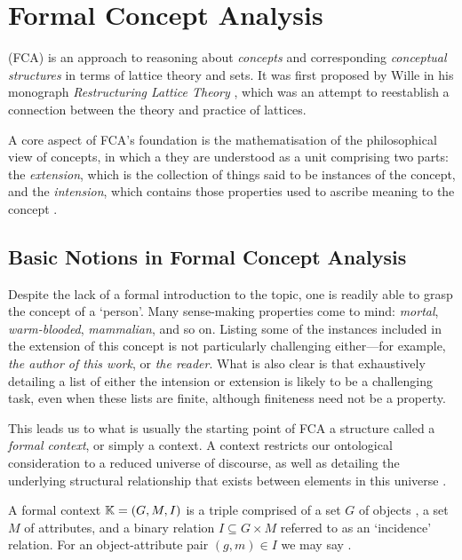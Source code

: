 \chapter{Formal Concept Analysis}
\label{chapter:formal-concept-analysis}


\FCA (FCA) \cite{Wille_Restructuring,WILLE1992493,ganter1999formal} is an
approach to reasoning about \textit{concepts} and corresponding
\textit{conceptual structures} in terms of lattice theory and sets. It was
first proposed by Wille in his monograph \textit{Restructuring Lattice Theory}
\cite{Wille_Restructuring}, which was an attempt to reestablish a connection
between the theory and practice of lattices.

A core aspect of FCA’s foundation is the mathematisation of the philosophical
view of concepts, in which a they are understood as a unit comprising two
parts: the \textit{extension}, which is the collection of things said to be
instances of the concept, and the \textit{intension}, which contains those
properties used to ascribe meaning to the concept \cite{DUQUENNE1999407}.

\section{Basic Notions in Formal Concept Analysis}
\label{section:basic-notions}

Despite the lack of a formal introduction to the topic, one is readily
able to grasp the concept of a `person'. Many sense-making properties
come to mind: \textit{mortal}, \textit{warm-blooded}, \textit{mammalian}, and so
on. Listing some of the instances included in the extension of this concept is
not particularly challenging either---for example, \textit{the author of this
	work}, or \textit{the reader}. What is also clear is that exhaustively detailing
a list of either the intension or extension is likely to be a challenging task,
even when these lists are finite, although finiteness need not be a property.

This leads us to what is usually the starting point of FCA a structure called a
\textit{formal context}, or simply a context. A context restricts our ontological
consideration to a reduced universe of discourse, as well as detailing the
underlying structural relationship that exists between elements in this universe
\cite{Wille_Restructuring,Dau2005}.

\begin{definition}
	 \label{definition:formal-context} A formal context $\mathbb{K}
		= (G,M,\mathrel{I})$ is a triple comprised of a set $G$ of objects , a set $M$ of attributes,
	and a binary relation $I \subseteq G \times M$ referred to as an `incidence'
	relation. For an object-attribute pair $(g,m) \in I$ we may say .
\end{definition}

